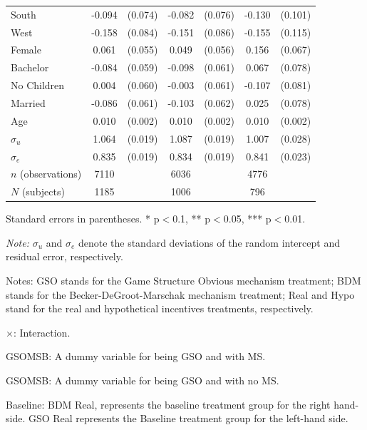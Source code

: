 \documentclass[12pt]{article}
\newcommand{\sym}[1]{\rlap{$^{#1}$}}
\begin{document}
\begin{table}[H]
{\begin{tabular}{l*{3}{cc}}
South       &      -0.094         &     (0.074)&      -0.082         &     (0.076)&      -0.130         &     (0.101)\\
West        &      -0.158\sym{*}  &     (0.084)&      -0.151\sym{*}  &     (0.086)&      -0.155         &     (0.115)\\
Female      &       0.061         &     (0.055)&       0.049         &     (0.056)&       0.156\sym{**} &     (0.067)\\
Bachelor    &      -0.084         &     (0.059)&      -0.098         &     (0.061)&       0.067         &     (0.078)\\
No Children &       0.004         &     (0.060)&      -0.003         &     (0.061)&      -0.107         &     (0.081)\\
Married     &      -0.086         &     (0.061)&      -0.103\sym{*}  &     (0.062)&       0.025         &     (0.078)\\
Age         &       0.010\sym{***}&     (0.002)&       0.010\sym{***}&     (0.002)&       0.010\sym{***}&     (0.002)\\
$\sigma_u$     &       1.064\sym{***}&     (0.019)&       1.087\sym{***}&     (0.019)&       1.007\sym{***}&     (0.028)\\
$\sigma_e$    &       0.835\sym{***}&     (0.019)&       0.834\sym{***}&     (0.019)&       0.841\sym{***}&     (0.023)\\

\(n\) (observations)       &        7110         &            &        6036         &            &        4776         &            \\
\(N\) (subjects)       &        1185         &            &       1006         &            &        796        &            \\
\end{tabular}
}


\begin{tablenotes}
            \footnotesize
            \item Standard errors in parentheses. * p$<$0.1, ** p$<$0.05, *** p$<$0.01.
            \item \textit{Note:} $\sigma_u$ and $\sigma_e$ denote the standard deviations of the random intercept and residual error, respectively.
            \item Notes: GSO stands for the Game Structure Obvious mechanism treatment; BDM stands for the Becker-DeGroot-Marschak mechanism treatment; Real and Hypo stand for the real and hypothetical incentives treatments, respectively.
           \item $\times$: Interaction.
           \item GSOMSB: A dummy variable for being GSO and with MS.
           \item GSOMSB: A dummy variable for being GSO and with no MS.
           \item Baseline: BDM Real, represents the baseline treatment group for the right hand-side.
           GSO Real represents the Baseline treatment group for the left-hand side.
        \end{tablenotes}

\end{table}
\end{document}
